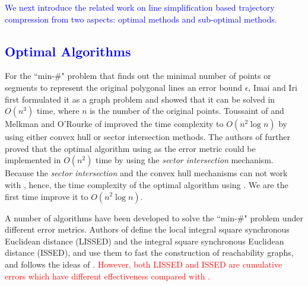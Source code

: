 \textcolor{blue}{We next introduce the related work on line simplification based trajectory compression from two aspects: optimal methods and sub-optimal methods.}

\vspace{-1ex}
\subsection{\textcolor{blue}{Optimal Algorithms}}
For the ``min-\#" problem that finds out the minimal number of points or segments to represent the original polygonal lines \wrt an error bound $\epsilon$, Imai and Iri \cite{Imai:Optimal} first formulated it as a graph problem and showed that it can be solved in  $O(n^3)$ time, where $n$ is the number of the original points.
%
Toussaint of \cite{Toussaint:Optimal} and Melkman and O'Rourke of \cite{Melkman:Optimal} improved the time complexity to $O(n^2 \log n)$ by using either convex hull or sector intersection methods.
%
The authors of \cite{Chan:Optimal} further proved that the optimal algorithm using \ped as the error metric could be implemented in $O(n^2)$ time by using the \textit{sector intersection} mechanism. 
Because the \textit{sector intersection} and the convex hull mechanisms can not work with \sed, hence, the time complexity of the optimal algorithm using . 
We are the first time improve it to $O(n^2\log n)$.  



A number of algorithms \cite{Chen:Fast,Wu:Graph} have been developed to solve the ``min-\#" problem under different error metrics.
Authors of \cite{Chen:Fast} define the local integral square synchronous Euclidean distance (LISSED) and the integral square synchronous Euclidean distance (ISSED), and use them to fast the construction of reachability graphs, and \cite{Wu:Graph} follows the ideas of \cite{Chen:Fast}. 
\textcolor{red}{However, both LISSED and ISSED are cumulative errors which have different effectiveness compared with \sed.} 

%


